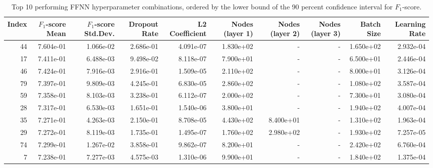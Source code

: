 \begin{table}
\caption{Top 10 performing FFNN hyperparameter combinations, ordered by the lower bound of the 90 percent confidence interval for $F_1$-score.}
\label{tab:05_best_ffnn_hpars}
\begin{tabular}{rrrrrrrrrr}
\toprule
Index & $F_1$-score Mean & $F_1$-score Std.Dev. & Dropout Rate & L2 Coefficient & Nodes (layer 1) & Nodes (layer 2) & Nodes (layer 3) & Batch Size & Learning Rate \\
\midrule
44 & 7.604e-01 & 1.066e-02 & 2.686e-01 & 4.091e-07 & 1.830e+02 & - & - & 1.650e+02 & 2.932e-04 \\
17 & 7.411e-01 & 6.488e-03 & 9.498e-02 & 8.118e-07 & 7.900e+01 & - & - & 6.500e+01 & 2.446e-04 \\
46 & 7.424e-01 & 7.916e-03 & 2.916e-01 & 1.509e-05 & 2.110e+02 & - & - & 8.000e+01 & 3.126e-04 \\
79 & 7.397e-01 & 9.809e-03 & 4.245e-01 & 6.830e-05 & 2.860e+02 & - & - & 1.080e+02 & 3.587e-04 \\
59 & 7.358e-01 & 8.103e-03 & 3.238e-01 & 6.112e-07 & 2.000e+02 & - & - & 7.300e+01 & 3.080e-04 \\
28 & 7.317e-01 & 6.530e-03 & 1.651e-01 & 1.540e-06 & 3.800e+01 & - & - & 1.940e+02 & 4.007e-04 \\
35 & 7.271e-01 & 4.263e-03 & 2.150e-01 & 8.708e-05 & 4.430e+02 & 8.400e+01 & - & 1.310e+02 & 1.963e-04 \\
29 & 7.272e-01 & 8.119e-03 & 1.735e-01 & 1.495e-07 & 1.760e+02 & 2.980e+02 & - & 1.930e+02 & 7.257e-05 \\
74 & 7.299e-01 & 1.267e-02 & 3.858e-01 & 9.862e-07 & 8.200e+01 & - & - & 2.420e+02 & 6.760e-04 \\
7 & 7.238e-01 & 7.277e-03 & 4.575e-03 & 1.310e-06 & 9.900e+01 & - & - & 1.840e+02 & 1.375e-04 \\
\bottomrule
\end{tabular}
\end{table}
